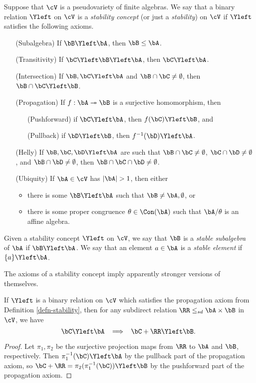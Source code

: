 \begin{defn}\label{defn-stability} Suppose that $\cV$ is a pseudovariety of finite algebras. We say that a binary relation $\Yleft$ on $\cV$ is a \emph{stability concept} (or just a \emph{stability}) on $\cV$ if $\Yleft$ satisfies the following axioms.
\begin{itemize}
\item[(Subalgebra)] If $\bB \Yleft \bA$, then $\bB \le \bA$.
\item[(Transitivity)] If $\bC \Yleft \bB \Yleft \bA$, then $\bC \Yleft \bA$.
\item[(Intersection)] If $\bB, \bC \Yleft \bA$ and $\bB \cap \bC \ne \emptyset$, then $\bB \cap \bC \Yleft \bB$.
\item[(Propagation)] If $f : \bA \twoheadrightarrow \bB$ is a surjective homomorphism, then
\begin{itemize}
\item[(Pushforward)] if $\bC \Yleft \bA$, then $f(\bC) \Yleft \bB$, and
\item[(Pullback)] if $\bD \Yleft \bB$, then $f^{-1}(\bD) \Yleft \bA$.
\end{itemize}
\item[(Helly)] If $\bB, \bC, \bD \Yleft \bA$ are such that $\bB \cap \bC \ne \emptyset$, $\bC \cap \bD \ne \emptyset$, and $\bB \cap \bD \ne \emptyset$, then $\bB \cap \bC \cap \bD \ne \emptyset$.
\item[(Ubiquity)] If $\bA \in \cV$ has $|\bA| > 1$, then either
\begin{itemize}
\item there is some $\bB \Yleft \bA$ such that $\bB \ne \bA, \emptyset$, or
\item there is some proper congruence $\theta \in \Con(\bA)$ such that $\bA/\theta$ is an affine algebra.
\end{itemize}
\end{itemize}
Given a stability concept $\Yleft$ on $\cV$, we say that $\bB$ is a \emph{stable subalgebra} of $\bA$ if $\bB \Yleft \bA$. We say that an element $a \in \bA$ is a \emph{stable element} if $\{a\} \Yleft \bA$.
\end{defn}

The axioms of a stability concept imply apparently stronger versions of themselves.

\begin{prop} If $\Yleft$ is a binary relation on $\cV$ which satisfies the propagation axiom from Definition \ref{defn-stability}, then for any subdirect relation $\RR \le_{sd} \bA \times \bB$ in $\cV$, we have
\[
\bC \Yleft \bA \;\; \implies \;\; \bC + \RR \Yleft \bB.
\]
\end{prop}
\begin{proof} Let $\pi_1, \pi_2$ be the surjective projection maps from $\RR$ to $\bA$ and $\bB$, respectively. Then $\pi_1^{-1}(\bC) \Yleft \bA$ by the pullback part of the propagation axiom, so $\bC + \RR = \pi_2(\pi_1^{-1}(\bC)) \Yleft \bB$ by the pushforward part of the propagation axiom.
\end{proof}

